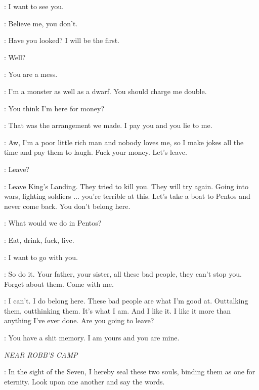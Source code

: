 
\SHAE: I want to see you. 

\TYRION: Believe me, you don't. 

\SHAE: Have you looked? I will be the first. 


\TYRION: Well? 

\SHAE:  You are a mess. 

\TYRION: I'm a monster as well as a dwarf. You should charge me double. 

\SHAE: You think I'm here for money? 

\TYRION: That was the arrangement we made. I pay you and you lie to me. 

\SHAE: Aw, I'm a poor little rich man and nobody loves me, so I make jokes all the time and pay them to laugh. Fuck your money. Let's leave. 

\TYRION: Leave? 

\SHAE: Leave King's Landing. They tried to kill you. They will try again. Going into wars, fighting soldiers $\ldots$ you're terrible at this. Let's take a boat to Pentos and never come back. You don't belong here. 

\TYRION: What would we do in Pentos? 

\SHAE: Eat, drink, fuck, live. 

\TYRION: I want to go with you. 

\SHAE: So do it.  Your father, your sister, all these bad people, they can't stop you. Forget about them. Come with me. 

\TYRION: I can't. I do belong here. These bad people are what I'm good at. Outtalking them, outthinking them. It's what I am. And I like it. I like it more than anything I've ever done. Are you going to leave? 

\SHAE: You have a shit memory. I am yours and you are mine. 



\scene

\textit{NEAR ROBB'S CAMP} 


\SEPTON: In the sight of the Seven, I hereby seal these two souls, binding them as one for eternity. Look upon one another and say the words. 


